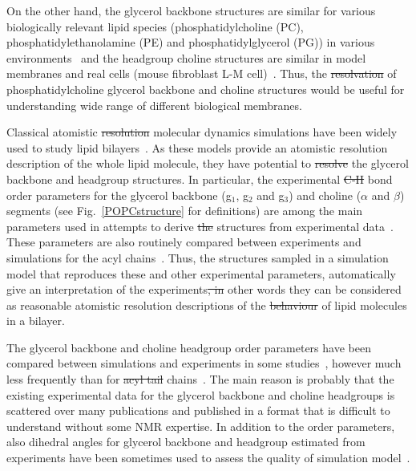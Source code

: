 \documentclass[pre,aps,floatfix,authordate1-4,twocolumn]{revtex4-1}
\providecommand{\DIFadd}[1]{{\protect\color{blue}\uwave{#1}}} %
\providecommand{\DIFdel}[1]{{\protect\color{red}\sout{#1}}}                      %
\providecommand{\DIFaddbegin}{} %
\providecommand{\DIFaddend}{} %
\providecommand{\DIFdelbegin}{} %
\providecommand{\DIFdelend}{} %
\begin{document}
On the other hand, the glycerol backbone structures are similar for various biologically
relevant lipid species (phosphatidylcholine (PC), phosphatidylethanolamine (PE) and phosphatidylglycerol (PG)) 
in various environments~\cite{gally81} and the headgroup choline structures are similar in model membranes and
real cells (mouse fibroblast L-M cell)~\cite{scherer87}.
Thus, the \DIFdelbegin \DIFdel{resolvation }\DIFdelend \DIFaddbegin \DIFadd{solution }\DIFaddend of phosphatidylcholine glycerol backbone and choline structures would be 
useful for understanding \DIFaddbegin \DIFadd{a }\DIFaddend wide range of different biological membranes.

Classical atomistic \DIFdelbegin \DIFdel{resolution }\DIFdelend molecular dynamics simulations have been widely used to study  
lipid bilayers~\cite{tieleman97,klauda08,edholm08,tieleman10,piggot12,rabinovich13}. As these models provide an atomistic
resolution description of the whole lipid molecule, they have potential to \DIFdelbegin \DIFdel{resolve }\DIFdelend \DIFaddbegin \DIFadd{solve }\DIFaddend the glycerol backbone and 
headgroup structures. In particular, the experimental \DIFdelbegin \DIFdel{C-H }\DIFdelend \DIFaddbegin \DIFadd{C--H }\DIFaddend bond order parameters for the glycerol backbone 
(g$_1$, g$_2$ and g$_3$) and choline ($\alpha$ and $\beta$) segments (see Fig.~\ref{POPCstructure} for definitions) are among the main parameters used in
attempts to derive \DIFdelbegin \DIFdel{the }\DIFdelend \DIFaddbegin \DIFadd{lipid }\DIFaddend structures from experimental data~\cite{seelig77b,skarjune79,jacobs80,davis83,akutsu91,hong95b,semchyschyn04}.
These parameters are also routinely compared between experiments and simulations for the acyl chains~\cite{tieleman97,klauda08,edholm08,tieleman10,piggot12}.
Thus, the structures sampled in a simulation model that reproduces these and other experimental parameters, automatically
give an interpretation of the experiments\DIFdelbegin \DIFdel{, in }\DIFdelend \DIFaddbegin \DIFadd{. In }\DIFaddend other words they can be considered as reasonable atomistic resolution descriptions of
the \DIFdelbegin \DIFdel{behaviour }\DIFdelend \DIFaddbegin \DIFadd{behavior }\DIFaddend of lipid molecules in a bilayer.

The glycerol backbone and choline headgroup order parameters have been compared between simulations and experiments
in some studies~\cite{shinoda97,hogberg08,castro08,klauda10,kapla12,dickson12,poger12,ferreira13,chowdhary13,maciejewski14}, 
however much less frequently than for \DIFdelbegin \DIFdel{acyl tail }\DIFdelend \DIFaddbegin \DIFadd{the acyl  }\DIFaddend chains~\cite{tieleman97,klauda08,edholm08,tieleman10,piggot12}.
The main reason is probably that the existing experimental data for the glycerol backbone
and choline headgroups is scattered over many publications and published in a format that is difficult to understand without some NMR expertise. 
In addition to the order parameters, also dihedral angles for glycerol backbone and headgroup estimated from experiments have been sometimes used to 
assess the quality of \DIFaddbegin \DIFadd{a }\DIFaddend simulation model~\cite{robinson94,essex94,kothekar96,hyvonen97,shinoda97,duong99}.
\end{document}
